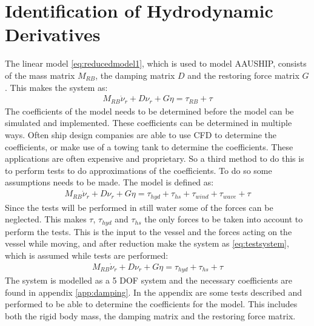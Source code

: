\section{Identification of Hydrodynamic Derivatives}
\label{sec:hydrocoeff}
The linear model \eqref{eq:reducedmodel1}, which is used to model AAUSHIP, consists of the mass matrix $M_{RB}$, the damping matrix $D$ and the restoring force matrix $G$. This makes the system as:
\begin{align}
M_{RB} \dot \nu_r + D\nu_r + G\eta = \tau_{RB} + \tau
\label{eq:reducedmodel1}
\end{align}
The coefficients of the model needs to be determined before the model can be simulated and implemented. These coefficients can be determined in multiple ways. Often ship design companies are able to use \ac{CFD} to determine the coefficients, or make use of a towing tank to determine the coefficients. These applications are often expensive and proprietary. So a third method to do this is to perform tests to do approximations of the coefficients. To do so some assumptions needs to be made. The model is defined as:
\begin{align}
M_{RB} \dot \nu_r + D\nu_r + G\eta = \tau_{hyd} + \tau_{hs} + \tau_{wind} + \tau_{wave} + \tau
\end{align}
Since the tests will be performed in still water some of the forces can be neglected. This makes $\tau$, $\tau_{hyd}$ and $\tau_{hs}$ the only forces to be taken into account to perform the tests. This is the input to the vessel and the forces acting on the vessel while moving, and after reduction make the system as \ref{eq:testsystem}, which is assumed while tests are performed:
\begin{align}
M_{RB} \dot \nu_r + D\nu_r + G\eta = \tau_{hyd} + \tau_{hs} + \tau
\label{eq:testsystem}
\end{align}
The system is modelled as a 5 \ac{DOF} system and the necessary coefficients are found in appendix \ref{app:damping}. In the appendix are some tests described and performed to be able to determine the coefficients for the model. This includes both the rigid body mass, the damping matrix and the restoring force matrix.

